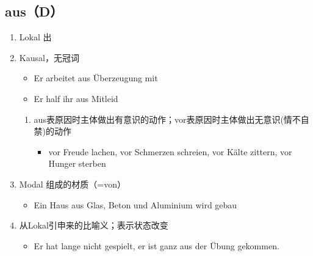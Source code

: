 \documentclass[UTF8]{report}
\begin{document}
\subsection{aus（D）}
\begin{enumerate}
    \item Lokal 出
    \item Kausal，无冠词
    \begin{itemize}
        \item Er arbeitet aus Überzeugung mit
        \item Er half ihr aus Mitleid
    \end{itemize}
    \begin{enumerate}
        \item aus表原因时主体做出有意识的动作；vor表原因时主体做出无意识(情不自禁)的动作
        \begin{itemize}
            \item vor Freude lachen, vor Schmerzen schreien, vor Kälte zittern, vor Hunger sterben
        \end{itemize}
    \end{enumerate}
    \item Modal 组成的材质（=von）
    \begin{itemize}
        \item Ein Haus aus Glas, Beton und Aluminium wird gebau
    \end{itemize}
    \item 从Lokal引申来的比喻义；表示状态改变
    \begin{itemize}
        \item Er hat lange nicht gespielt, er ist ganz aus der Übung gekommen.
    \end{itemize}
\end{enumerate}
\end{document}
